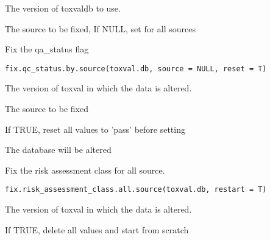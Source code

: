 \documentclass[letterpaper]{book}
\begin{document}
%
\begin{Arguments}
\begin{ldescription}
\item[\code{toxval.db}] The version of toxvaldb to use.

\item[\code{source}] The source to be fixed, If NULL, set for all sources
\end{ldescription}
\end{Arguments}
%
\begin{Description}\relax
Fix the qa\_status flag
\end{Description}
%
\begin{Usage}
\begin{verbatim}
fix.qc_status.by.source(toxval.db, source = NULL, reset = T)
\end{verbatim}
\end{Usage}
%
\begin{Arguments}
\begin{ldescription}
\item[\code{toxval.db}] The version of toxval in which the data is altered.

\item[\code{source}] The source to be fixed

\item[\code{reset}] If TRUE, reset all values to 'pass' before setting
\end{ldescription}
\end{Arguments}
%
\begin{Value}
The database will be altered
\end{Value}
%
\begin{Description}\relax
Fix the risk assessment class for all source.
\end{Description}
%
\begin{Usage}
\begin{verbatim}
fix.risk_assessment_class.all.source(toxval.db, restart = T)
\end{verbatim}
\end{Usage}
%
\begin{Arguments}
\begin{ldescription}
\item[\code{toxval.db}] The version of toxval in which the data is altered.

\item[\code{restart}] If TRUE, delete all values and start from scratch
\end{ldescription}
\end{Arguments}
\end{document}
